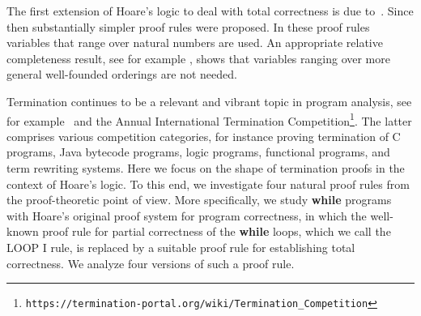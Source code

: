 \documentclass[runningheads]{llncs}       %
\begin{document}
The first extension of Hoare's logic
to deal with total correctness is due to~\cite{MP74}. 
Since then substantially simpler proof rules were proposed.
In these proof rules variables that range over natural numbers are used.
An appropriate relative completeness result, see for example \cite{ABO09}, 
shows that variables ranging over more general well-founded orderings 
are not needed.

Termination continues to be a relevant and vibrant topic in program
analysis, see for example~\cite{CookPR11} and the Annual International
Termination Competition\footnote{
\texttt{https://termination-portal.org/wiki/Termination\_Competition}}.
The latter comprises various competition categories, 
for instance proving termination of 
C programs, Java bytecode programs, logic programs,
functional programs, and term rewriting systems.
Here we focus on the shape of termination proofs in the context of
Hoare's logic. 
To this end, we investigate four natural proof rules 
from the proof-theoretic point of view.
More specifically, we study {\bf while} programs with Hoare's 
original proof system for program correctness, in which the well-known
proof rule for partial correctness of the {\bf while} loops, which we
call the LOOP I rule, is replaced by a suitable proof rule for
establishing total correctness.  We analyze four versions of such a
proof rule. 



\medskip

\NI
\end{document}
